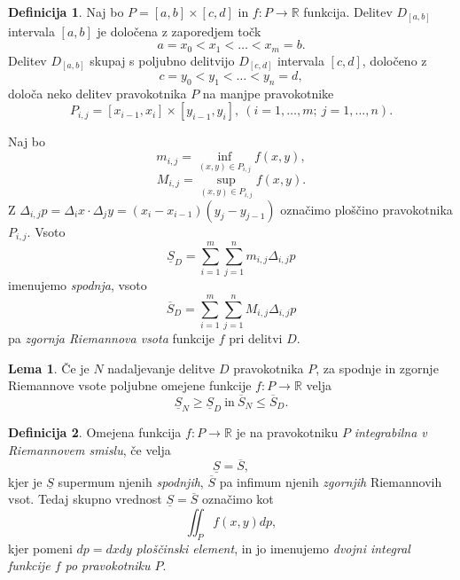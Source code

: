 \documentclass[11pt]{article}
\theoremstyle{definition}
\newtheorem{definicija}{Definicija}[section]
\theoremstyle{definition}
\theoremstyle{definition}
\newtheorem{lema}{Lema}[section]
\begin{document}
\begin{definicija}

Naj bo $P = [a, b] \times [c, d]$ in $f: P \rightarrow \mathbb{R}$ funkcija. Delitev $D_{[a, b]}$ intervala $[a, b]$ je določena z zaporedjem točk
$$a = x_0 < x_1 < \ldots < x_m = b.$$
Delitev $D_{[a, b]}$ skupaj s poljubno delitvijo $D_{[c, d]}$ intervala $[c, d]$, določeno z 
$$c = y_0 < y_1 < \ldots < y_n = d,$$
določa neko delitev pravokotnika $P$ na manjpe pravokotnike
$$P_{i,j} = [x_{i-1}, x_i] \times [y_{i-1}, y_i], ~(i = 1, \ldots, m; ~j = 1, \ldots, n).$$

Naj bo 
$$m_{i,j} = \inf_{(x,y) \in P_{i,j}} f(x, y),$$
$$M_{i,j} = \sup_{(x,y) \in P_{i,j}} f(x, y).$$
Z $\Delta_{i,j} p = \Delta_i x \cdot \Delta_j y = (x_i - x_{i-1})(y_j - y_{j-1})$ označimo ploščino pravokotnika $P_{i,j}$. 
Vsoto
$$\underline{S}_D = \sum_{i=1}^{m} \sum_{j=1}^{n} m_{i,j} \Delta_{i,j} p$$
imenujemo \textit{spodnja}, vsoto
$$\overline{S}_D = \sum_{i=1}^{m} \sum_{j=1}^{n} M_{i,j} \Delta_{i,j} p$$
pa \textit{zgornja Riemannova vsota} funkcije $f$ pri delitvi $D$.

\end{definicija}
\vspace{0.5cm}

\begin{lema}

Če je $N$ nadaljevanje delitve $D$ pravokotnika $P$, za spodnje in zgornje Riemannove vsote poljubne omejene funkcije $f: P \rightarrow \mathbb{R}$ velja
$$\underline{S}_N \geq \underline{S}_D ~\text{in}~ \overline{S}_N \leq \overline{S}_D.$$

\end{lema}
\vspace{0.5cm}

\begin{definicija}

Omejena funkcija $f: P \rightarrow \mathbb{R}$ je na pravokotniku $P$ \textit{integrabilna v Riemannovem smislu}, če velja
$$\underline{S} = \overline{S},$$
kjer je $\underline{S}$ supermum njenih \textit{spodnjih}, $\overline{S}$ pa infimum njenih \textit{zgornjih} Riemannovih vsot. Tedaj skupno vrednost $\underline{S} = \overline{S}$ označimo kot 
$$\iint_P f(x, y) dp,$$
kjer pomeni $dp = dxdy$ \textit{ploščinski element}, in jo imenujemo \textit{dvojni integral funkcije $f$ po pravokotniku $P$}.

\end{definicija}
\vspace{0.5cm}
\end{document}
